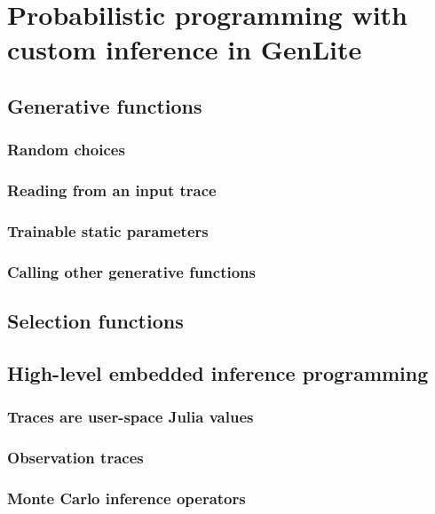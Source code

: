 \section{Probabilistic programming with custom inference in GenLite}

\subsection{Generative functions}

\subsubsection{Random choices}

\subsubsection{Reading from an input trace}

\subsubsection{Trainable static parameters}

\subsubsection{Calling other generative functions}

\subsection{Selection functions}

\subsection{High-level embedded inference programming}

\subsubsection{Traces are user-space Julia values}

\subsubsection{Observation traces}

\subsubsection{Monte Carlo inference operators}

